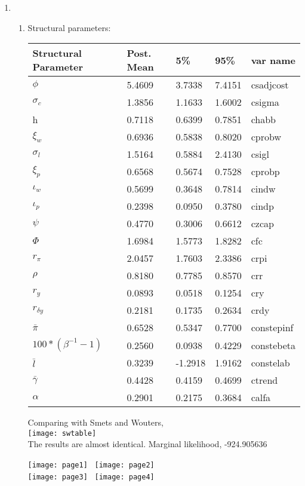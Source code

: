 \documentclass[]{article}
\begin{document}
\begin{enumerate}
\begin{enumerate}
\end{enumerate}
\item \begin{enumerate}
	\item Structural parameters: \\ 
	\begin{center}
\begin{tabular}{l l l l l}
	Structural Parameter & Post. Mean & 5\% & 95\% & var name \\  
	\hline 
$ \phi $ & 5.4609   &   3.7338   &   7.4151 & csadjcost \\
$\sigma_c $ & 1.3856  &    1.1633   &   1.6002 & csigma\\
h & 0.7118  &    0.6399   &   0.7851 & chabb  \\
$\xi_w $ &  0.6936  &    0.5838   &   0.8020 & cprobw \\
$ \sigma_l $ & 1.5164  &    0.5884   &   2.4130  & csigl \\
$ \xi_p $ & 0.6568  &    0.5674    &  0.7528 & cprobp \\
$ \iota_w $ & 0.5699   &   0.3648  &    0.7814 & cindw \\
$ \iota_p $ & 0.2398  &    0.0950  &    0.3780 & cindp\\ 
$ \psi $ & 0.4770   &   0.3006    &  0.6612 & czcap \\
$ \Phi $ & 1.6984   &   1.5773   &   1.8282 & cfc \\
$ r_{\pi} $ &  2.0457   &   1.7603  &    2.3386 & crpi \\
$ \rho $ & 0.8180   &   0.7785   &   0.8570 & crr\\
$ r_y $ & 0.0893  &    0.0518   &   0.1254 & cry \\
$ r_{\delta y} $ & 0.2181   &   0.1735   &   0.2634 & crdy\\
$ \bar{\pi} $ & 0.6528  &    0.5347  &    0.7700 & constepinf\\
$ 100*(\beta^{-1} -1 ) $ & 0.2560   &   0.0938  &    0.4229 & constebeta \\
$ \bar{l} $ & 0.3239   &  -1.2918  &    1.9162 &  constelab\\
$ \bar{\gamma} $ & 0.4428  &    0.4159  &    0.4699& ctrend \\
$ \alpha $ & 0.2901    &  0.2175  &    0.3684 & calfa\\
\hline 
\end{tabular}
\end{center}
Comparing with Smets and Wouters, \\
\texttt{[image: swtable]} \\
The results are almost identical.  
Marginal likelihood, -924.905636 \\
\begin{center}
\texttt{[image: page1]}  \ \texttt{[image: page2]} \\
\texttt{[image: page3]} \ \texttt{[image: page4]}
\end{center}


\end{enumerate}
\end{enumerate}
\end{document}
